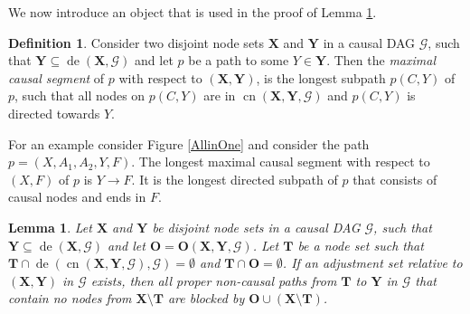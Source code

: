 \documentclass[11pt,a4paper]{article}
\newtheorem{Lemma}[Satz]{Lemma}
\theoremstyle{definition}
\newtheorem{Definition}[Satz]{Definition}
\theoremstyle{remark}
\DeclareMathOperator{\de}{de}
\DeclareMathOperator{\CN}{cn}
\newcommand{\g}[1][G]{\mathcal{#1}}
\newcommand{\cnb}[2][X,Y]{\CN(\mathbf{#1},#2)}
\newcommand{\optb}[2][X,Y]{\mathbf{O}(\mathbf{#1},#2)}
\begin{document}
We now introduce an object that is used in the proof of Lemma \ref{lemma:eadd}.

\begin{Definition}
	Consider two disjoint node sets $\mathbf{X}$ and $\mathbf{Y}$ in a causal DAG $\g$, such that $\mathbf{Y} \subseteq \de(\mathbf{X},\g)$ and let $p$  be a path to some $Y\in\mathbf{Y}$. Then the \emph{maximal causal segment} of $p$ with respect to $(\mathbf{X},\mathbf{Y})$, is the longest subpath $p(C,Y)$ of $p$, such that all nodes on $p(C,Y)$ are in $\cnb{\g}$ and $p(C,Y)$ is directed towards $Y$. 
\end{Definition} 

For an example consider Figure \ref{AllinOne} and consider the path $p=(X,A_1,A_2,Y,F)$. The longest maximal causal segment with respect to $(X,F)$ of $p$ is $Y \rightarrow F$. It is the longest directed subpath of $p$ that consists of causal nodes and ends in $F$. 

\begin{Lemma}
	Let $\mathbf{X}$ and $\mathbf{Y}$ be disjoint node sets in a causal DAG $\g$, such that $\mathbf{Y} \subseteq \de(\mathbf{X},\g)$ and let $\mathbf{O}=\optb{\g}$. Let $\mathbf{T}$ be a node set such that $\mathbf{T} \cap \de(\cnb{\g},\g) = \emptyset$ and $\mathbf{T} \cap \mathbf{O} = \emptyset$. If an adjustment set relative to $(\mathbf{X,Y})$ in $\g$ exists, then all proper non-causal paths from $\mathbf{T}$ to $\mathbf{Y}$ in $\g$ that contain no nodes from $\mathbf{X} \setminus \mathbf{T}$ are blocked by $\mathbf{O} \cup (\mathbf{X} \setminus \mathbf{T})$.  

	\label{lemma:eadd}
\end{Lemma}
\end{document}

